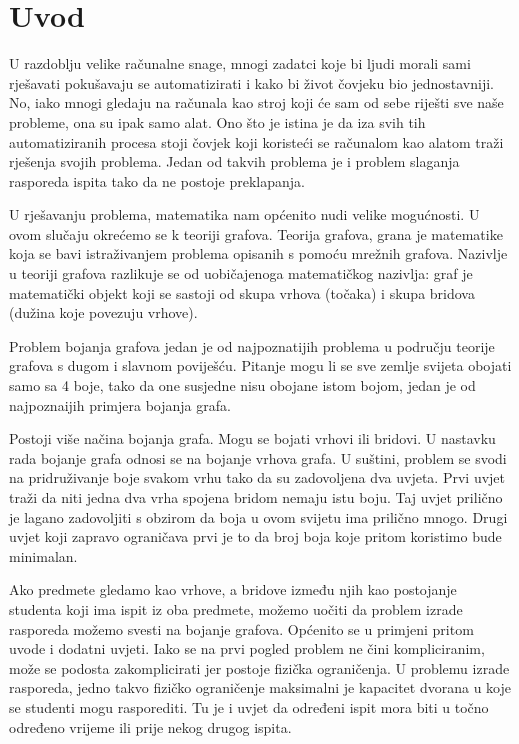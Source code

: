 \documentclass[times, utf8, zavrsni, numeric]{fer}
\begin{document}
\chapter{Uvod}
U razdoblju velike računalne snage, mnogi zadatci koje bi ljudi morali sami rješavati pokušavaju se automatizirati i kako bi život čovjeku  bio jednostavniji. No, iako mnogi gledaju na računala kao stroj koji će sam od sebe riješti sve naše probleme, ona su ipak samo alat. Ono što je istina je da iza svih tih automatiziranih procesa stoji čovjek koji koristeći se računalom kao alatom traži rješenja svojih problema. Jedan od takvih problema je i problem slaganja rasporeda ispita tako da ne postoje preklapanja.\par
U rješavanju problema, matematika nam općenito nudi velike mogućnosti. U ovom slučaju okrećemo se k teoriji grafova. Teorija grafova, grana je matematike koja se bavi istraživanjem problema opisanih s pomoću mrežnih grafova. Nazivlje u teoriji grafova razlikuje se od uobičajenoga matematičkog nazivlja: graf je matematički objekt koji se sastoji od skupa vrhova (točaka) i skupa bridova (dužina koje povezuju vrhove).\par 
Problem bojanja grafova jedan je od najpoznatijih problema u području teorije grafova s dugom i slavnom poviješću. Pitanje mogu li se sve zemlje svijeta obojati samo sa 4 boje, tako da one susjedne nisu obojane istom bojom, jedan je od najpoznaijih primjera bojanja grafa.\par
Postoji više načina bojanja grafa. Mogu se bojati vrhovi ili bridovi. U nastavku rada bojanje grafa odnosi se na bojanje vrhova grafa. U suštini, problem se svodi na pridruživanje boje svakom vrhu tako da su zadovoljena dva uvjeta. Prvi uvjet traži da niti jedna dva vrha spojena bridom nemaju istu boju. Taj uvjet prilično je lagano zadovoljiti s obzirom da boja u ovom svijetu ima prilično mnogo. Drugi uvjet koji zapravo ograničava prvi je to da broj boja koje pritom koristimo bude minimalan.\par
Ako predmete gledamo kao vrhove, a bridove između njih kao postojanje studenta koji ima ispit iz oba predmete, možemo uočiti da problem izrade rasporeda možemo svesti na bojanje grafova. Općenito se u primjeni pritom uvode i dodatni uvjeti. Iako se na prvi pogled problem ne čini kompliciranim, može se podosta zakomplicirati jer postoje fizička ograničenja. U problemu izrade rasporeda, jedno takvo fizičko ograničenje  maksimalni je kapacitet dvorana u koje se studenti mogu rasporediti. Tu je i uvjet da određeni ispit mora biti u točno određeno vrijeme ili prije nekog drugog ispita. \par
\end{document}

